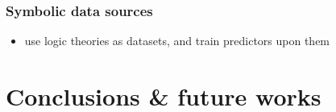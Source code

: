 \documentclass[presentation]{beamer}\mode<presentation>{\usetheme{AMSBolognaFC}}
\begin{document}
\begin{frame}%
    \frametitle{Symbolic data sources}

    \begin{itemize}
        \item use logic theories as datasets, and train predictors upon them
    \end{itemize}


\end{frame}

\section{Conclusions \& future works}
\end{document}
